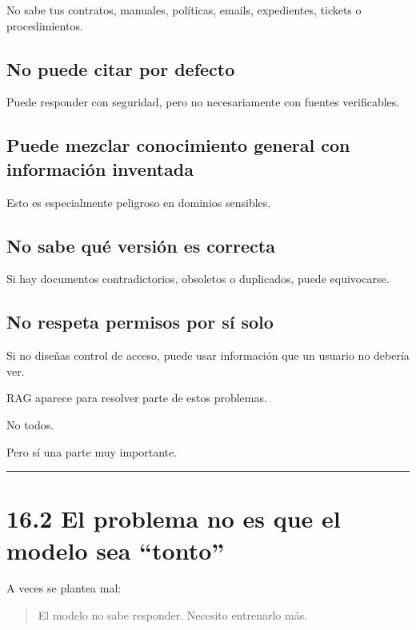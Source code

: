 No sabe tus contratos, manuales, políticas, emails, expedientes, tickets
o procedimientos.

\subsection{No puede citar por
defecto}\label{no-puede-citar-por-defecto}

Puede responder con seguridad, pero no necesariamente con fuentes
verificables.

\subsection{Puede mezclar conocimiento general con información
inventada}\label{puede-mezclar-conocimiento-general-con-informaciuxf3n-inventada}

Esto es especialmente peligroso en dominios sensibles.

\subsection{No sabe qué versión es
correcta}\label{no-sabe-quuxe9-versiuxf3n-es-correcta}

Si hay documentos contradictorios, obsoletos o duplicados, puede
equivocarse.

\subsection{No respeta permisos por sí
solo}\label{no-respeta-permisos-por-suxed-solo}

Si no diseñas control de acceso, puede usar información que un usuario
no debería ver.

RAG aparece para resolver parte de estos problemas.

No todos.

Pero sí una parte muy importante.

\begin{center}\rule{0.5\linewidth}{0.5pt}\end{center}

\section{16.2 El problema no es que el modelo sea
``tonto''}\label{el-problema-no-es-que-el-modelo-sea-tonto}

A veces se plantea mal:

\begin{quote}
El modelo no sabe responder. Necesito entrenarlo más.
\end{quote}

